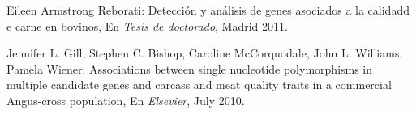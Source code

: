 \documentclass[12pt,a4paper,titlepage]{report}
\begin{document}
\begin{thebibliography}{99}

Eileen Armstrong Reborati: Detección y análisis de genes asociados a la calidadd e carne en bovinos, En \emph{Tesis de doctorado}, Madrid 2011.

Jennifer L. Gill, Stephen C. Bishop, Caroline McCorquodale, John L. Williams, Pamela Wiener: Associations between single nucleotide polymorphisms in multiple candidate genes and carcass and meat quality traits in a commercial Angus-cross population, En \emph{Elsevier}, July 2010.

\end{thebibliography}



\end{document}
